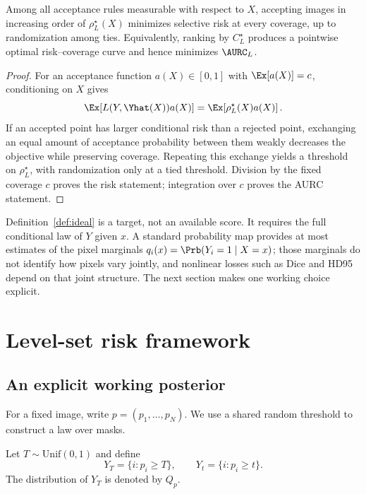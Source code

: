 \begin{proposition}\label{prop:ideal-ranking}
Among all acceptance rules measurable with respect to $X$, accepting images in
increasing order of $\rho_L^\star(X)$ minimizes selective risk at every coverage,
up to randomization among ties. Equivalently, ranking by $C_L^\star$ produces a
pointwise optimal risk--coverage curve and hence minimizes $\AURC_L$.
\end{proposition}
\begin{proof}
For an acceptance function $a(X)\in[0,1]$ with $\Ex[a(X)]=c$, conditioning on $X$
gives
\begin{equation*}
  \Ex\!\left[L(Y,\Yhat(X))a(X)\right]
  =\Ex\!\left[\rho_L^\star(X)a(X)\right].
\end{equation*}
If an accepted point has larger conditional risk than a rejected point, exchanging
an equal amount of acceptance probability between them weakly decreases the
objective while preserving coverage. Repeating this exchange yields a threshold on
$\rho_L^\star$, with randomization only at a tied threshold. Division by the fixed
coverage $c$ proves the risk statement; integration over $c$ proves the AURC
statement.
\end{proof}

Definition~\ref{def:ideal} is a target, not an available score. It requires the full
conditional law of $Y$ given $x$. A standard probability map provides at most
estimates of the pixel marginals
$q_i(x)=\Prb(Y_i=1\mid X=x)$; those marginals do not identify how pixels vary jointly,
and nonlinear losses such as Dice and HD95 depend on that joint structure. The next
section makes one working choice explicit.

\section{Level-set risk framework}\label{sec:framework}

\subsection{An explicit working posterior}\label{sec:posterior}

For a fixed image, write $p=(p_1,\ldots,p_N)$. We use a shared random threshold to
construct a law over masks.

\begin{definition}\label{def:levelset}
Let $T\sim\mathrm{Unif}(0,1)$ and define
\begin{equation}\label{eq:levelset}
  Y_T=\{i:p_i\geq T\},
  \qquad
  Y_t=\{i:p_i\geq t\}.
\end{equation}
The distribution of $Y_T$ is denoted by $Q_p$.
\end{definition}

